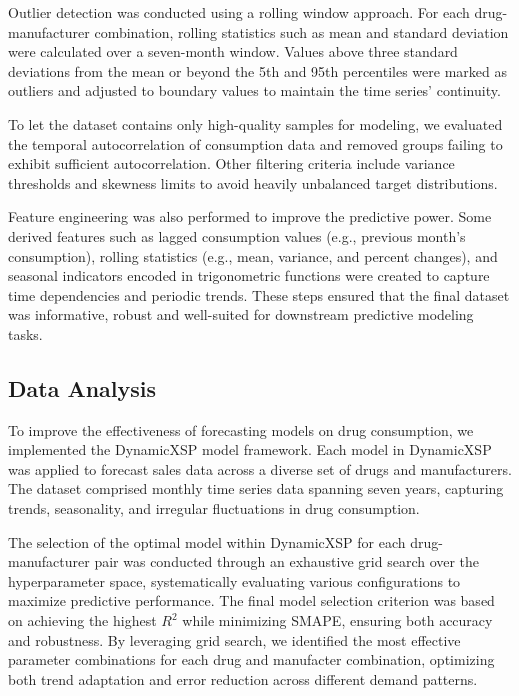 \documentclass[12pt]{article}
\begin{document}
Outlier detection was conducted using a rolling window approach. For each drug-manufacturer combination, rolling statistics such as mean and standard deviation were calculated over a seven-month window. Values above three standard deviations from the mean or beyond the 5th and 95th percentiles were marked as outliers and adjusted to boundary values to maintain the time series' continuity.

To let the dataset contains only high-quality samples for modeling, we evaluated the temporal autocorrelation of consumption data and removed groups failing to exhibit sufficient autocorrelation. Other filtering criteria include variance thresholds and skewness limits to avoid heavily unbalanced target distributions.

Feature engineering was also performed to improve the predictive power. Some derived features such as lagged consumption values (e.g., previous month’s consumption), rolling statistics (e.g., mean, variance, and percent changes), and seasonal indicators encoded in trigonometric functions were created to capture time dependencies and periodic trends. These steps ensured that the final dataset was informative, robust and well-suited for downstream predictive modeling tasks.


\subsection{Data Analysis}

To improve the effectiveness of forecasting models on drug consumption, we implemented the DynamicXSP model framework. Each model in DynamicXSP was applied to forecast sales data across a diverse set of drugs and manufacturers. The dataset comprised monthly time series data spanning seven years, capturing trends, seasonality, and irregular fluctuations in drug consumption. 

The selection of the optimal model within DynamicXSP for each drug-manufacturer pair was conducted through an exhaustive grid search over the hyperparameter space, systematically evaluating various configurations to maximize predictive performance. The final model selection criterion was based on achieving the highest $R^2$ while minimizing SMAPE, ensuring both accuracy and robustness. By leveraging grid search, we identified the most effective parameter combinations for each drug and manufacter combination, optimizing both trend adaptation and error reduction across different demand patterns.
\end{document}
